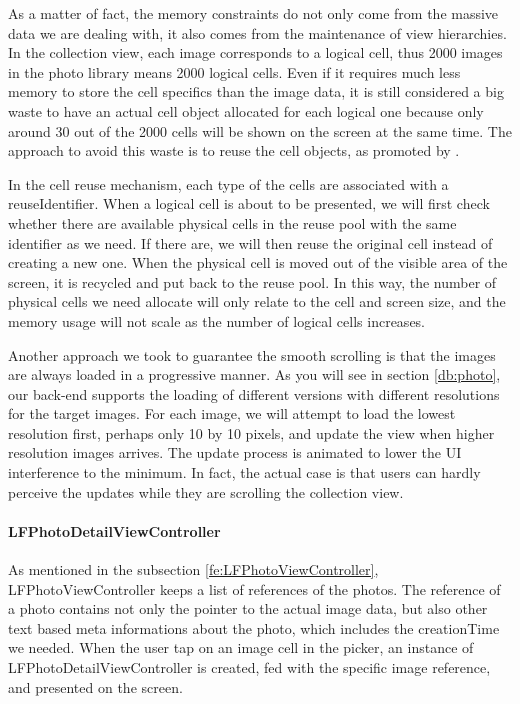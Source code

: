 \documentclass[12pt,a4paper]{article}
\renewcommand\texttt[1]{{\ttfamily\color{textttColor}#1}}
\begin{document}
            As a matter of fact, the memory constraints do not only come from the massive data we are dealing with, it also comes from the maintenance of view hierarchies. In the collection view, each image corresponds to a logical cell, thus 2000 images in the photo library means 2000 logical cells. Even if it requires much less memory to store the cell specifics than the image data, it is still considered a big waste to have an actual cell object allocated for each logical one because only around 30 out of the 2000 cells will be shown on the screen at the same time. The approach to avoid this waste is to reuse the cell objects, as promoted by \citet{AppleUITableViewCell}.
            
            In the cell reuse mechanism, each type of the cells are associated with a \texttt{reuseIdentifier}. When a logical cell is about to be presented, we will first check whether there are available physical cells in the reuse pool with the same identifier as we need. If there are, we will then reuse the original cell instead of creating a new one. When the physical cell is moved out of the visible area of the screen, it is recycled and put back to the reuse pool. In this way, the number of physical cells we need allocate will only relate to the cell and screen size, and the memory usage will not scale as the number of logical cells increases.
            
            Another approach we took to guarantee the smooth scrolling is that the images are always loaded in a progressive manner. As you will see in section \ref{db:photo}, our back-end supports the loading of different versions with different resolutions for the target images. For each image, we will attempt to load the lowest resolution first, perhaps only 10 by 10 pixels, and update the view when higher resolution images arrives. The update process is animated to lower the UI interference to the minimum. In fact, the actual case is that users can hardly perceive the updates while they are scrolling the collection view.
            
            \paragraph{LFPhotoDetailViewController} As mentioned in the subsection \ref{fe:LFPhotoViewController}, \texttt{LFPhotoViewController} keeps a list of references of the photos. The reference of a photo contains not only the pointer to the actual image data, but also other text based meta informations about the photo, which includes the \texttt{creationTime} we needed. When the user tap on an image cell in the picker, an instance of \texttt{LFPhotoDetailViewController} is created, fed with the specific image reference, and presented on the screen.
            
\end{document}
